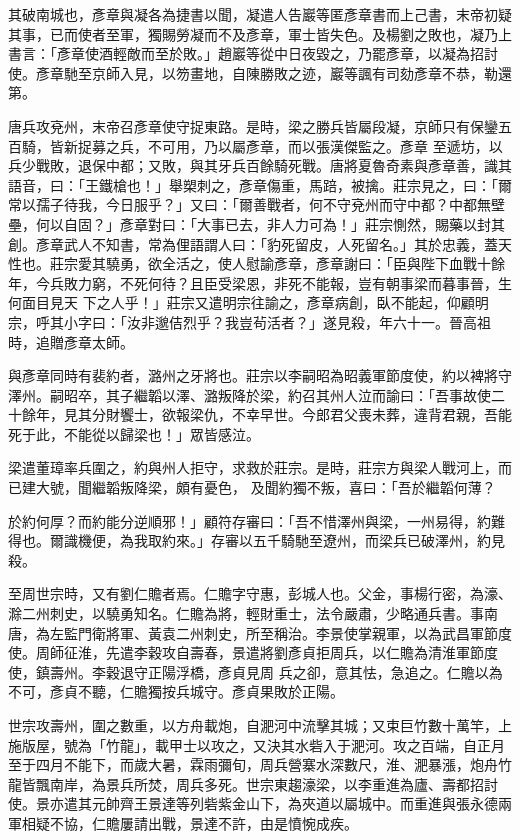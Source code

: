 \begin{pinyinscope}
 其破南城也，彥章與凝各為捷書以聞，凝遣人告巖等匿彥章書而上己書，末帝初疑其事，已而使者至軍，獨賜勞凝而不及彥章，軍士皆失色。及楊劉之敗也，凝乃上書言：「彥章使酒輕敵而至於敗。」趙巖等從中日夜毀之，乃罷彥章，以凝為招討使。彥章馳至京師入見，以笏畫地，自陳勝敗之迹，巖等諷有司劾彥章不恭，勒還第。



 唐兵攻兗州，末帝召彥章使守捉東路。是時，梁之勝兵皆屬段凝，京師只有保鑾五百騎，皆新捉募之兵，不可用，乃以屬彥章，而以張漢傑監之。彥章
 至遞坊，以兵少戰敗，退保中都；又敗，與其牙兵百餘騎死戰。唐將夏魯奇素與彥章善，識其語音，曰：「王鐵槍也！」舉槊刺之，彥章傷重，馬踣，被擒。莊宗見之，曰：「爾常以孺子待我，今日服乎？」又曰：「爾善戰者，何不守兗州而守中都？中都無壁壘，何以自固？」彥章對曰：「大事已去，非人力可為！」莊宗惻然，賜藥以封其創。彥章武人不知書，常為俚語謂人曰：「豹死留皮，人死留名。」其於忠義，蓋天性也。莊宗愛其驍勇，欲全活之，使人慰諭彥章，彥章謝曰：「臣與陛下血戰十餘年，今兵敗力窮，不死何待？且臣受梁恩，非死不能報，豈有朝事梁而暮事晉，生何面目見天
 下之人乎！」莊宗又遣明宗往諭之，彥章病創，臥不能起，仰顧明宗，呼其小字曰：「汝非邈佶烈乎？我豈茍活者？」遂見殺，年六十一。晉高祖時，追贈彥章太師。



 與彥章同時有裴約者，潞州之牙將也。莊宗以李嗣昭為昭義軍節度使，約以裨將守澤州。嗣昭卒，其子繼韜以澤、潞叛降於梁，約召其州人泣而諭曰：「吾事故使二十餘年，見其分財饗士，欲報梁仇，不幸早世。今郎君父喪未葬，違背君親，吾能死于此，不能從以歸梁也！」眾皆感泣。



 梁遣董璋率兵圍之，約與州人拒守，求救於莊宗。是時，莊宗方與梁人戰河上，而已建大號，聞繼韜叛降梁，頗有憂色，
 及聞約獨不叛，喜曰：「吾於繼韜何薄？



 於約何厚？而約能分逆順邪！」顧符存審曰：「吾不惜澤州與梁，一州易得，約難得也。爾識機便，為我取約來。」存審以五千騎馳至遼州，而梁兵已破澤州，約見殺。



 至周世宗時，又有劉仁贍者焉。仁贍字守惠，彭城人也。父金，事楊行密，為濠、滁二州刺史，以驍勇知名。仁贍為將，輕財重士，法令嚴肅，少略通兵書。事南唐，為左監門衛將軍、黃袁二州刺史，所至稱治。李景使掌親軍，以為武昌軍節度使。周師征淮，先遣李穀攻自壽春，景遣將劉彥貞拒周兵，以仁贍為清淮軍節度使，鎮壽州。李穀退守正陽浮橋，彥貞見周
 兵之卻，意其怯，急追之。仁贍以為不可，彥貞不聽，仁贍獨按兵城守。彥貞果敗於正陽。



 世宗攻壽州，圍之數重，以方舟載炮，自淝河中流擊其城；又束巨竹數十萬竿，上施版屋，號為「竹龍」，載甲士以攻之，又決其水砦入于淝河。攻之百端，自正月至于四月不能下，而歲大暑，霖雨彌旬，周兵營寨水深數尺，淮、淝暴漲，炮舟竹龍皆飄南岸，為景兵所焚，周兵多死。世宗東趨濠梁，以李重進為廬、壽都招討使。景亦遣其元帥齊王景達等列砦紫金山下，為夾道以屬城中。而重進與張永德兩軍相疑不協，仁贍屢請出戰，景達不許，由是憤惋成疾。




\end{pinyinscope}
